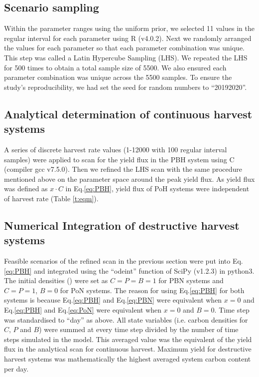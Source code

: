 \documentclass[../thesis.tex]{subfiles} %
\begin{document}
\subsection{Scenario sampling}
Within the parameter ranges using the uniform prior, we selected 11 values in the regular interval for each parameter using R (v4.0.2).  Next we randomly arranged the values for each parameter so that each parameter combination was unique.  This step was called a Latin Hypercube Sampling (LHS).  We repeated the LHS for 500 times to obtain a total sample size of 5500.  We also ensured each parameter combination was unique across the 5500 samples.  To ensure the study’s reproducibility, we had set the seed for random numbers to ``20192020”.

\subsection{Analytical determination of continuous harvest systems}
A series of discrete harvest rate values (1-12000 \dayU with 100 regular interval samples) were applied to scan for the yield flux in the PBH system using C (compiler gcc v7.5.0).  Then we refined the LHS scan with the same procedure mentioned above on the parameter space around the peak yield flux.  As yield flux was defined as $x\cdot C$ in Eq.\ref{eq:PBH}, yield flux of PoH systems were independent of harvest rate (Table \ref{t:eqm}).

\subsection{Numerical Integration of destructive harvest systems}
Feasible scenarios of the refined scan in the previous section were put into Eq.\ref{eq:PBH} and integrated using the ``odeint” function of SciPy (v1.2.3) in python3.  The initial densities (\den) were set as $C=P=B=1$ for PBN systems and $C=P=1$, $B=0$ for PoN systems.  The reason for using Eq.\ref{eq:PBH} for both systems is because Eq.\ref{eq:PBH} and Eq.\ref{eq:PBN} were equivalent when $x=0$ and Eq.\ref{eq:PBH} and Eq.\ref{eq:PoN} were equivalent when $x=0$ and $B=0$.  Time step was standardised to ``day” as above.  All state variables (i.e. carbon densities for $C$, $P$ and $B$) were summed at every time step divided by the number of time steps simulated in the model.  This averaged value was the equivalent of the yield flux in the analytical scan for continuous harvest.  Maximum yield for destructive harvest systems was mathematically the highest averaged system carbon content per day.
\end{document}
